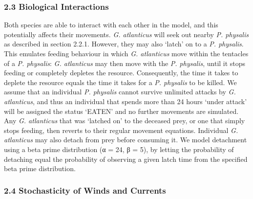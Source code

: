 \documentclass[
]{article}
\newenvironment{Shaded}{\begin{snugshade}}{\end{snugshade}}
\newcommand{\CommentTok}[1]{\textcolor[rgb]{0.56,0.35,0.01}{\textit{#1}}}
\newcommand{\ControlFlowTok}[1]{\textcolor[rgb]{0.13,0.29,0.53}{\textbf{#1}}}
\newcommand{\DecValTok}[1]{\textcolor[rgb]{0.00,0.00,0.81}{#1}}
\newcommand{\FunctionTok}[1]{\textcolor[rgb]{0.00,0.00,0.00}{#1}}
\newcommand{\NormalTok}[1]{#1}
\newcommand{\OtherTok}[1]{\textcolor[rgb]{0.56,0.35,0.01}{#1}}
\newcommand{\SpecialCharTok}[1]{\textcolor[rgb]{0.00,0.00,0.00}{#1}}
\newcommand{\StringTok}[1]{\textcolor[rgb]{0.31,0.60,0.02}{#1}}
\begin{document}
\begin{Shaded}
\end{Shaded}

\hypertarget{biological-interactions}{%
\subsubsection{2.3 Biological
Interactions}\label{biological-interactions}}

Both species are able to interact with each other in the model, and this
potentially affects their movements. \emph{G. atlanticus} will seek out
nearby \emph{P. physalis} as described in section 2.2.1. However, they
may also `latch' on to a \emph{P. physalis}. This emulates feeding
behaviour in which \emph{G. atlanticus} move within the tentacles of a
\emph{P. physalis}: \emph{G. atlanticus} may then move with the \emph{P.
physalis}, until it stops feeding or completely depletes the resource.
Consequently, the time it takes to deplete the resource equals the time
it takes for a \emph{P. physalis} to be killed. We assume that an
individual \emph{P. physalis} cannot survive unlimited attacks by
\emph{G. atlanticus}, and thus an individual that spends more than 24
hours `under attack' will be assigned the status `EATEN' and no further
movements are simulated. Any \emph{G. atlanticus} that was `latched on'
to the deceased prey, or one that simply stops feeding, then reverts to
their regular movement equations. Individual \emph{G. atlanticus} may
also detach from prey before consuming it. We model detachment using a
beta prime distribution (α = 24, β = 5), by letting the probability of
detaching equal the probability of observing a given latch time from the
specified beta prime distribution.

\hypertarget{stochasticity-of-winds-and-currents}{%
\subsubsection{2.4 Stochasticity of Winds and
Currents}\label{stochasticity-of-winds-and-currents}}
\end{document}
